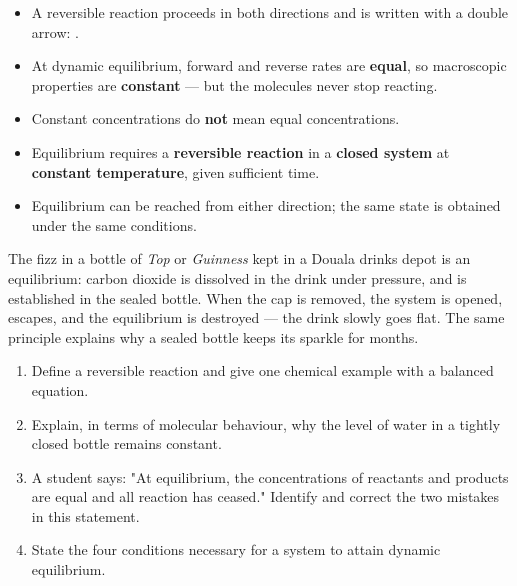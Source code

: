 \documentclass[11pt]{article}
\newcommand{\cle}[1]{{\popxbold\color{popdark}#1}}
\begin{document}
\begin{aretenir}
\begin{itemize}
\item A \cle{reversible reaction} proceeds in both directions and is written with a double arrow: .
\item At \cle{dynamic equilibrium}, forward and reverse rates are \textbf{equal}, so macroscopic properties are \textbf{constant} — but the molecules never stop reacting.
\item Constant concentrations do \textbf{not} mean equal concentrations.
\item Equilibrium requires a \textbf{reversible reaction} in a \textbf{closed system} at \textbf{constant temperature}, given sufficient time.
\item Equilibrium can be reached from either direction; the same state is obtained under the same conditions.
\end{itemize}
\end{aretenir}

\begin{savaistu}
The fizz in a bottle of \emph{Top} or \emph{Guinness} kept in a Douala drinks depot is an equilibrium: carbon dioxide is dissolved in the drink under pressure, and  is established in the sealed bottle. When the cap is removed, the system is opened,  escapes, and the equilibrium is destroyed — the drink slowly goes flat. The same principle explains why a sealed bottle keeps its sparkle for months.
\end{savaistu}

\begin{exercice}
\begin{enumerate}
\item Define a reversible reaction and give one chemical example with a balanced equation.
\item Explain, in terms of molecular behaviour, why the level of water in a tightly closed bottle remains constant.
\item A student says: "At equilibrium, the concentrations of reactants and products are equal and all reaction has ceased." Identify and correct the two mistakes in this statement.
\item State the four conditions necessary for a system to attain dynamic equilibrium.
\end{enumerate}
\end{exercice}
\end{document}
